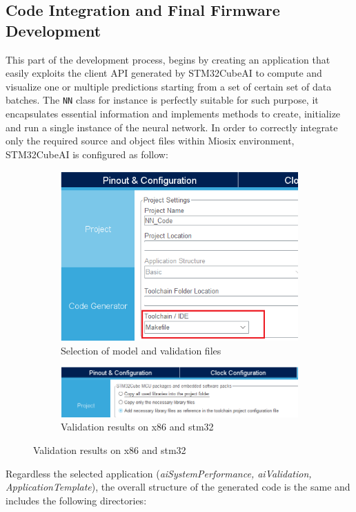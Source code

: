 \subsection{Code Integration and Final Firmware Development}
This part of the development process, begins by creating an application that easily exploits the client API generated by STM32CubeAI to compute and visualize one or multiple predictions starting from a set of certain set of data batches. The \texttt{NN} class for instance is perfectly suitable for such purpose, it encapsulates essential information and implements methods to create, initialize and run a single instance of the neural network. 
In order to correctly integrate only the required source and object files within Miosix environment, STM32CubeAI is configured as follow:
\begin{center}
	\begin{figure}[H]
		\begin{subfigure}[H]{0.5\textwidth}
			\hfill\includegraphics[scale=0.55]{figures/stm32cubemx_conf2.png}\vspace*{\fill}
			\hfill\caption{Selection of model and validation files}\vspace*{\fill}
		\end{subfigure}
		\hfill
		\begin{subfigure}[H]{0.5\textwidth}
			\hfill\includegraphics[scale=0.55]{figures/stm32cubemx_conf1.png}\vspace*{\fill}
			\caption{Validation results on x86 and stm32}
		\end{subfigure}
	\end{figure}
\end{center}
Regardless the selected application (\textit{aiSystemPerformance, aiValidation, ApplicationTemplate}), the overall structure of the generated code is the same and includes the following directories:

